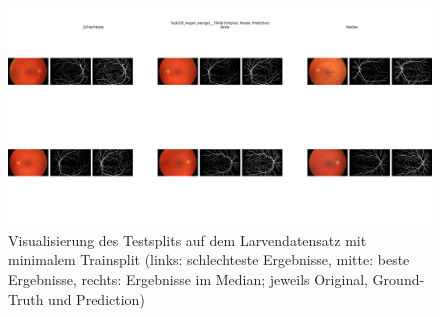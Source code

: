 \begin{figure}[H]
\centering
\includegraphics[height=0.35\textheight, width=\textwidth]{Pictures/nnUnet/Praxis/Task205-Augen-minimal-13-trainsamples/Vis-Train.png}
\caption{Visualisierung des Testsplits auf dem Larvendatensatz mit minimalem Trainsplit (links: schlechteste Ergebnisse, mitte: beste Ergebnisse, rechts: Ergebnisse im Median; jeweils Original, Ground-Truth und Prediction)}
\label{pic:Vis-Test_205}
\end{figure}





